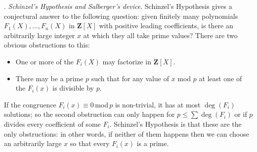 \documentclass[12pt]{article}
\def\bZ{{\mathbf Z}}
\begin{document}
. \emph{Schinzel's Hypothesis and Salberger's device}. \newline
Schinzel's Hypothesis gives a conjectural answer
to the following question: given finitely many polynomials $F_1(X),\ldots,
F_n(X)$ in $\bZ[X]$ with positive leading coefficients, is there an
arbitrarily large integer $x$ at which they all take prime values? There are
two obvious obstructions to this:
\begin{itemize}
\item One or more of the $F_i(X)$ may factorize in $\bZ[X]$.
\item There may be a prime $p$ such that for any value of $x$ mod $p$ at
least one of the $F_i(x)$ is divisible by $p$.
\end{itemize}
If the congruence $F_i(x)\equiv0\,$mod$\,p$ is non-trivial, it
has at most $\deg(F_i)$ solutions; so the second obstruction
can only happen for $p\leq\sum\deg(F_i)$ or
if $p$ divides every coefficient of some $F_i$.
Schinzel's Hypothesis is that these are the only obstructions: in other words,
if neither of them happens then we can choose an arbitrarily large $x$ so
that every $F_i(x)$ is a prime.
\end{document}
